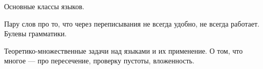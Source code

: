 Основные классы языков. 

Пару слов про то, что через переписывания не всегда удобно, не всегда работает. Булевы грамматики.

Теоретико-множественные задачи над языками и их применение.
О том, что многое --- про пересечение, проверку пустоты, вложенность.





